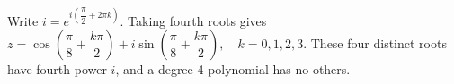 Write $i=e^{i(\dfrac{\pi}{2}+2\pi k)}$. Taking fourth roots gives $\boxed{z=\cos(\dfrac{\pi}{8}+\dfrac{k\pi}{2})+i\sin(\dfrac{\pi}{8}+\dfrac{k\pi}{2}),\quad k=0,1,2,3}$. These four distinct roots have fourth power $i$, and a degree 4 polynomial has no others.
